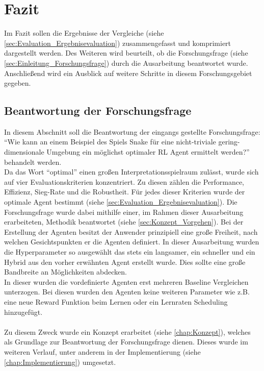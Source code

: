 \chapter{Fazit}
Im Fazit sollen die Ergebnisse der Vergleiche (siehe \ref{sec:Evaluation_Ergebnisevaluation}) zusammengefasst und komprimiert dargestellt werden. Des Weiteren wird beurteilt, ob die Forschungsfrage (siehe \ref{sec:Einleitung_Forschungsfrage}) durch die Ausarbeitung beantwortet wurde.
Anschließend wird ein Ausblick auf weitere Schritte in diesem Forschungsgebiet gegeben.

\section{Beantwortung der Forschungsfrage}
In diesem Abschnitt soll die Beantwortung der eingangs gestellte Forschungsfrage:\\
"`Wie kann an einem Beispiel des Spiels Snake für eine nicht-triviale gering-dimensionale Umgebung ein möglichst optimaler RL Agent ermittelt werden?"' behandelt werden.\\
Da das Wort "`optimal"' einen großen Interpretationsspielraum zulässt, wurde sich auf vier Evaluationskriterien konzentriert. Zu diesen zählen die Performance, Effizienz, Sieg-Rate und die Robustheit. Für jedes dieser Kriterien wurde der optimale Agent bestimmt (siehe \ref{sec:Evaluation_Ergebnisevaluation}).
Die Forschungsfrage wurde dabei mithilfe einer, im Rahmen dieser Ausarbeitung erarbeiteten, Methodik beantwortet (siehe \ref{sec:Konzept_Vorgehen}).
Bei der Erstellung der Agenten besitzt der Anwender prinzipiell eine große Freiheit, nach welchen Gesichtspunkten er die Agenten definiert. In dieser Ausarbeitung wurden die Hyperparameter so ausgewählt das stets ein langsamer, ein schneller und ein Hybrid aus den vorher erwähnten Agent erstellt wurde. Dies sollte eine große Bandbreite an Möglichkeiten abdecken.\\
In dieser wurden die vordefinierte Agenten erst mehreren Baseline Vergleichen unterzogen. Bei diesen wurden den Agenten keine weiteren Parameter wie z.B. eine neue Reward Funktion beim Lernen oder ein Lernraten Scheduling hinzugefügt.\\
\\Zu diesem Zweck wurde ein Konzept erarbeitet (siehe \ref{chap:Konzept}), welches als Grundlage zur Beantwortung der Forschungsfrage dienen. Dieses wurde im weiteren Verlauf, unter anderem in der Implementierung (siehe \ref{chap:Implementierung}) umgesetzt.\\
